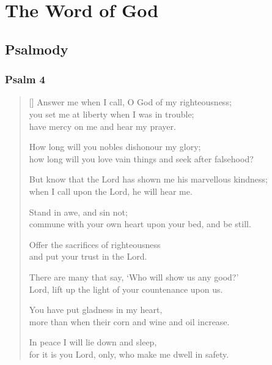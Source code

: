\documentclass[12pt]{report}
\begin{document}
	\newpage

	\section*{The Word of God}

	\subsection*{Psalmody}


	\subsubsection*{Psalm 4}

	\begin{verse}[\versewidth]
		Answer me when I call, O God of my righteousness; \Pause\\
		you set me at liberty when I was in trouble;\\
		\vin have mercy on me and hear my prayer.

		How long will you nobles dishonour my glory; \Pause\\
		how long will you love vain things and seek after falsehood?

		But know that the Lord has shown me his marvellous kindness; \Pause\\
		when I call upon the Lord, he will hear me.

		Stand in awe, and sin not; \Pause\\
		commune with your own heart upon your bed, and be still.

		Offer the sacrifices of righteousness \Pause\\
		and put your trust in the Lord.

		There are many that say, `Who will show us any good?' \Pause\\
		Lord, lift up the light of your countenance upon us.

		You have put gladness in my heart, \Pause\\
		more than when their corn and wine and oil increase.

		In peace I will lie down and sleep, \Pause\\
		for it is you Lord, only, who make me dwell in safety.
	\end{verse}
\end{document}
